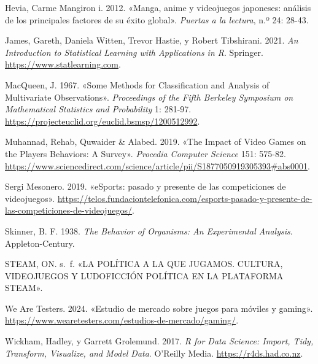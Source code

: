 \documentclass[
  letterpaper,
  DIV=11,
  numbers=noendperiod]{scrreprt}
\newlength{\cslhangindent}
\newlength{\cslentryspacingunit} %
\newenvironment{CSLReferences}[2] %
 {%
  \setlength{\parindent}{0pt}
  \ifodd #1
  \let\oldpar\par
  \def\par{\hangindent=\cslhangindent\oldpar}
  \fi
  \setlength{\parskip}{#2\cslentryspacingunit}
 }%
 {}
\begin{document}
\begin{CSLReferences}{1}{0}
\leavevmode{}%
Hevia, Carme Mangiron i. 2012. {«Manga, anime y videojuegos japoneses:
análisis de los principales factores de su éxito global»}. \emph{Puertas
a la lectura}, n.º 24: 28-43.

\leavevmode{}%
James, Gareth, Daniela Witten, Trevor Hastie, y Robert Tibshirani. 2021.
\emph{An Introduction to Statistical Learning with Applications in R}.
Springer. \url{https://www.statlearning.com}.

\leavevmode{}%
MacQueen, J. 1967. {«Some Methods for Classification and Analysis of
Multivariate Observations»}. \emph{Proceedings of the Fifth Berkeley
Symposium on Mathematical Statistics and Probability} 1: 281-97.
\url{https://projecteuclid.org/euclid.bsmsp/1200512992}.

\leavevmode{}%
Muhannad, Rehab, Quwaider \& Alabed. 2019. {«The Impact of Video Games
on the Players Behaviors: A Survey»}. \emph{Procedia Computer Science}
151: 575-82.
\url{https://www.sciencedirect.com/science/article/pii/S1877050919305393\#abs0001}.

\leavevmode{}%
Sergi Mesonero. 2019. {«eSports: pasado y presente de las competiciones
de videojuegos»}.
\url{https://telos.fundaciontelefonica.com/esports-pasado-y-presente-de-las-competiciones-de-videojuegos/}.

\leavevmode{}%
Skinner, B. F. 1938. \emph{The Behavior of Organisms: An Experimental
Analysis}. Appleton-Century.

\leavevmode{}%
STEAM, ON. s.~f. {«LA POLÍTICA A LA QUE JUGAMOS. CULTURA, VIDEOJUEGOS Y
LUDOFICCIÓN POLÍTICA EN LA PLATAFORMA STEAM»}.

\leavevmode{}%
We Are Testers. 2024. {«Estudio de mercado sobre juegos para móviles y
gaming»}.
\url{https://www.wearetesters.com/estudios-de-mercado/gaming/}.

\leavevmode{}%
Wickham, Hadley, y Garrett Grolemund. 2017. \emph{R for Data Science:
Import, Tidy, Transform, Visualize, and Model Data}. O'Reilly Media.
\url{https://r4ds.had.co.nz}.

\end{CSLReferences}
\end{document}

